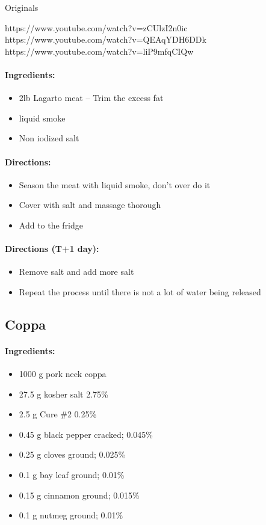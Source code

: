 \documentclass{article}
\begin{document}
Originals

https://www.youtube.com/watch?v=zCUlzI2n0ic
https://www.youtube.com/watch?v=QEAqYDH6DDk
https://www.youtube.com/watch?v=liP9mfqCIQw

\paragraph{Ingredients:}

\begin{itemize}
	\item 2lb Lagarto meat -- Trim the excess fat
	\item liquid smoke
	\item Non iodized salt
\end{itemize}

\paragraph{Directions:}
\begin{itemize}
	\item Season the meat with liquid smoke, don't over do it
	\item Cover with salt and massage thorough
	\item Add to the fridge
\end{itemize}

\paragraph{Directions (T+1 day):}
\begin{itemize}
	\item Remove salt and add more salt
	\item Repeat the process until there is not a lot of water being released
\end{itemize}

\subsection{Coppa}

\paragraph{Ingredients:}

\begin{itemize}
	\item 1000 g pork neck coppa	
	\item 27.5 g kosher salt 2.75\%
	\item 2.5 g Cure \#2 0.25\%
	\item 0.45 g black pepper cracked; 0.045\%
	\item 0.25 g cloves ground; 0.025\%
	\item 0.1 g bay leaf ground; 0.01\%
	\item 0.15 g cinnamon ground; 0.015\%
	\item 0.1 g nutmeg ground; 0.01\%
\end{itemize}
\end{document}
